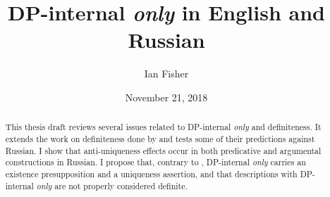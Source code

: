\documentclass{article}
\title{DP-internal \textit{only} in English and Russian}
\author{Ian Fisher}
\date{November 21, 2018}
\begin{document}
\maketitle

\begin{abstract}
This thesis draft reviews several issues related to DP-internal \textit{only} and definiteness. It extends the work on definiteness done by \citet{cb2012a, cb2012b, cb2015} and tests some of their predictions against Russian. I show that anti-uniqueness effects occur in both predicative and argumental constructions in Russian. I propose that, contrary to \citet{cb2015}, DP-internal \textit{only} carries an existence presupposition and a uniqueness assertion, and that descriptions with DP-internal \textit{only} are not properly considered definite.
\end{abstract}












\end{document}
